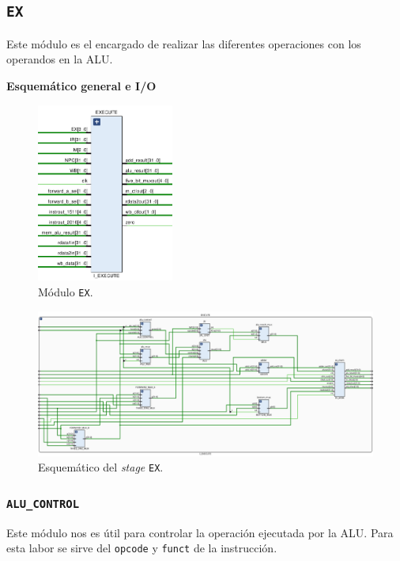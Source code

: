 \documentclass[a4paper]{article}
\begin{document}
\subsection{\texttt{EX}}
Este módulo es el encargado de realizar las diferentes operaciones con los operandos en la ALU.

\textbf{Esquemático general e I/O}

\begin{figure}[H]
	\begin{center}				
	\includegraphics[width=0.4\textwidth,center]{TP4_11.png}
  	\caption{Módulo \texttt{EX}.}
  	\label{fig:funcionamiento.}
  	\end{center}
\end{figure}

\begin{figure}[H]
	\begin{center}				
	\includegraphics[width=1.5\textwidth,center]{EX_2.png}
  	\caption{Esquemático del \textit{stage} \texttt{EX}.}
  	\label{fig:funcionamiento.}
  	\end{center}
\end{figure}

\subsubsection{\texttt{ALU\_CONTROL}}
Este módulo nos es útil para controlar la operación ejecutada por la ALU. Para esta labor se sirve del \texttt{opcode} y \texttt{funct} de la instrucción.
\end{document}
